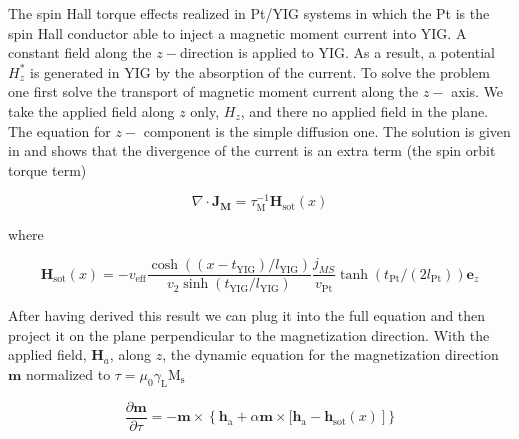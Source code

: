 \documentclass[review]{elsarticle}
\begin{document}
The spin Hall torque effects  realized in Pt/YIG systems in which the Pt is the spin Hall conductor able to inject a magnetic moment current into YIG. A constant field along the $z-$direction is applied to YIG. As a result, a potential 
$H^*_z$ is generated in YIG by the absorption of the current. To solve the problem one first solve the transport of magnetic moment current along the $z-$ axis. We take the applied field along $z$ only, $H_z$, and there no applied field 
in the plane. The equation for $z-$ component is the simple diffusion one. The solution is given in \cite{basso2016thermodynamic} and shows that the divergence of the current is an extra term (the spin orbit torque term)

\begin{equation}
\nabla \cdot \mathbf{J}_{\mathbf{M}} = \tau^{-1}_{{\mathrm{\scriptstyle{M}}}}\mathbf{H}_{\mathrm{\scriptstyle{sot}}}(x)
\end{equation}

where 


\begin{equation}
\mathbf{H}_{\mathrm{\scriptstyle{sot}}}(x) = - v_{\mathrm{\scriptstyle{eff}}} \frac{\cosh((x-t_{\mathrm{\scriptstyle{YIG}}})/l_{\mathrm{\scriptstyle{YIG}}})}{v_2 
\sinh(t_{\mathrm{\scriptstyle{YIG}}}/l_{\mathrm{\scriptstyle{YIG}}})} \frac{j_{MS}}{v_{\mathrm{\scriptstyle{Pt}}}} \tanh(t_{\mathrm{\scriptstyle{Pt}}}/(2 l_{\mathrm{\scriptstyle{Pt}}}))
\mathbf{e}_z
\end{equation}

After having derived this result we can plug it into the full equation and then project it on the plane perpendicular to the magnetization direction. With the applied field, $\mathbf{H}_{a}$, along $z$, the 
dynamic equation for the magnetization direction $\mathbf{m} $  normalized to $\tau=\mu_0\gamma_{\mathrm{\scriptstyle{L}}}\mathrm{M}_{\mathrm{\scriptstyle{s}}}$



\begin{equation}
\label{equation:dimensionless_lle}
\frac{\partial \mathbf{m}}{\partial  \tau}=-\mathbf{m} \times \left\{ \mathbf{h}_{\mathrm{\scriptstyle{a}}}+\alpha \mathbf{m} \times[ \mathbf{h}_{\mathrm{\scriptstyle{a}}}-\mathbf{h}
_{\mathrm{\scriptstyle{sot}}}(x)\right]\}
\end{equation}
\end{document}
